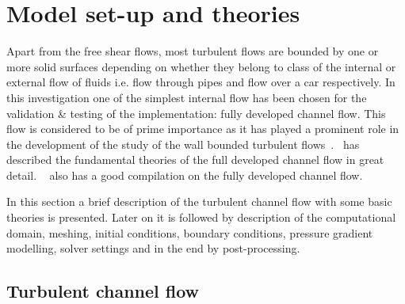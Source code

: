 \newpage

\section{Model set-up and theories}

Apart from the free shear flows, most turbulent flows are bounded by one or more solid surfaces depending on whether they belong to class of the internal or external flow of fluids i.e. flow through pipes and flow over a car respectively.  In this investigation one of the simplest internal flow has been chosen for the validation \& testing of the implementation: fully developed channel flow. This flow is considered to be of prime importance as it has played a prominent role in the development of the study of the wall bounded turbulent flows~\cite{pope:book}.~\cite{pope:book} has described the fundamental theories of the full developed channel flow in great detail. ~\cite{froehlich:book} also has a good compilation on the fully developed channel flow. 

In this section a brief description of the turbulent channel flow with some basic theories is presented. Later on it is followed by description of the computational domain, meshing, initial conditions, boundary conditions, pressure gradient modelling, solver settings and in the end by post-processing. 

\subsection{Turbulent channel flow}

